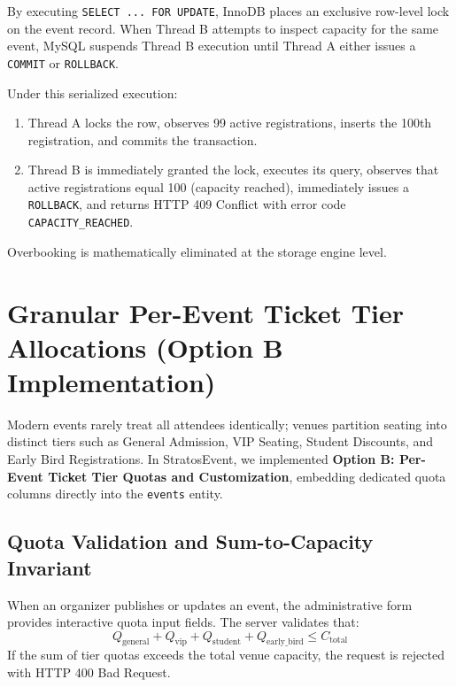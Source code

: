 \documentclass[11pt,a4paper]{report}
\begin{document}
By executing \texttt{SELECT ... FOR UPDATE}, InnoDB places an exclusive row-level lock on the event record. When Thread B attempts to inspect capacity for the same event, MySQL suspends Thread B execution until Thread A either issues a \texttt{COMMIT} or \texttt{ROLLBACK}. 

Under this serialized execution:
\begin{enumerate}[leftmargin=1.5em, itemsep=0.2em]
    \item Thread A locks the row, observes 99 active registrations, inserts the 100th registration, and commits the transaction.
    \item Thread B is immediately granted the lock, executes its query, observes that active registrations equal 100 (capacity reached), immediately issues a \texttt{ROLLBACK}, and returns HTTP 409 Conflict with error code \texttt{CAPACITY\_REACHED}.
\end{enumerate}
Overbooking is mathematically eliminated at the storage engine level.

\section{Granular Per-Event Ticket Tier Allocations (Option B Implementation)}
\justifying
Modern events rarely treat all attendees identically; venues partition seating into distinct tiers such as General Admission, VIP Seating, Student Discounts, and Early Bird Registrations. In StratosEvent, we implemented \textbf{Option B: Per-Event Ticket Tier Quotas and Customization}, embedding dedicated quota columns directly into the \texttt{events} entity.

\subsection{Quota Validation and Sum-to-Capacity Invariant}
When an organizer publishes or updates an event, the administrative form provides interactive quota input fields. The server validates that:
\begin{equation}
Q_{\text{general}} + Q_{\text{vip}} + Q_{\text{student}} + Q_{\text{early\_bird}} \le C_{\text{total}}
\end{equation}
If the sum of tier quotas exceeds the total venue capacity, the request is rejected with HTTP 400 Bad Request.
\end{document}
